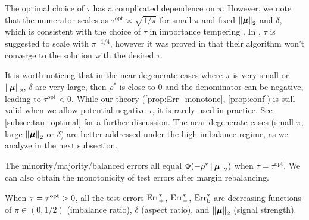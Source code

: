 \begin{rem}\label{rem:tau_pi}
    The optimal choice of $\tau$ has a complicated dependence on $\pi$. However, we note that the numerator scales as $\tau^\mathrm{opt} \asymp \sqrt{1/\pi}$ for small $\pi$ and fixed $\left\|{\text{\boldmath $\mu$}}\right\|_2$ and $\delta$, which is consistent with the choice of $\tau$ in importance tempering \cite{lu2022importance}. In \cite{cao2019learning}, $\tau$ is suggested to scale with $\pi^{-1/4}$, however it was proved in \cite{kini2021label} that their algorithm won't converge to the solution with the desired $\tau$.

    It is worth noticing that in the near-degenerate cases where $\pi$ is very small or $\left\|{\text{\boldmath $\mu$}}\right\|_2$, $\delta$ are very large, then $\rho^*$ is close to $0$ and the denominator can be negative,
    leading to $\tau^\mathrm{opt} < 0$. While our theory (\cref{prop:Err_monotone}, \cref{prop:conf}) is still valid when we allow potential negative $\tau$, it is rarely used in practice. See \cref{subsec:tau_optimal} for a further discussion. 
    The near-degenerate cases (small $\pi$, large $\left\|{\text{\boldmath $\mu$}}\right\|_2$ or $\delta$) are better addressed under the high imbalance regime, as we analyze in the next subsection. 
\end{rem}
The minority/majority/balanced errors all equal $\Phi(- \rho^* \left\|{\text{\boldmath $\mu$}}\right\|_2 )$ when $\tau = \tau^\mathrm{opt}$. 
We can also obtain the monotonicity of test errors after margin rebalancing.
\begin{prop}\label{prop:Err_monotone}
    When $\tau = \tau^{\rm opt} > 0$, all the test errors $\mathrm{Err}^*_+$, $\mathrm{Err}^*_-$, $\mathrm{Err}^*_\mathrm{b}$ are decreasing functions of $\pi \in (0, 1/2)$ (imbalance ratio), $\delta$ (aspect ratio), and $\left\|{\text{\boldmath $\mu$}}\right\|_2$ (signal strength).
\end{prop}

